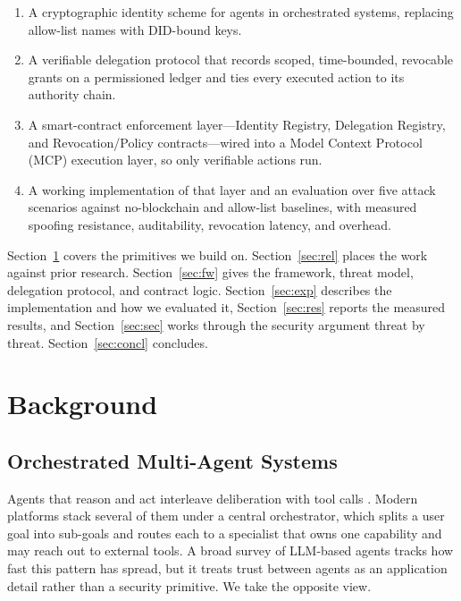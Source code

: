 \documentclass[conference]{IEEEtran}
\begin{document}
\begin{enumerate}
\item A cryptographic identity scheme for agents in orchestrated systems, replacing allow-list names with DID-bound keys.
\item A verifiable delegation protocol that records scoped, time-bounded, revocable grants on a permissioned ledger and ties every executed action to its authority chain.
\item A smart-contract enforcement layer---Identity Registry, Delegation Registry, and Revocation/Policy contracts---wired into a Model Context Protocol (MCP) execution layer, so only verifiable actions run.
\item A working implementation of that layer and an evaluation over five attack scenarios against no-blockchain and allow-list baselines, with measured spoofing resistance, auditability, revocation latency, and overhead.
\end{enumerate}

Section~\ref{sec:bg} covers the primitives we build on. Section~\ref{sec:rel} places the work against prior research. Section~\ref{sec:fw} gives the framework, threat model, delegation protocol, and contract logic. Section~\ref{sec:exp} describes the implementation and how we evaluated it, Section~\ref{sec:res} reports the measured results, and Section~\ref{sec:sec} works through the security argument threat by threat. Section~\ref{sec:concl} concludes.

\section{Background}\label{sec:bg}
\subsection{Orchestrated Multi-Agent Systems}
Agents that reason and act interleave deliberation with tool calls \cite{react2023}. Modern platforms stack several of them under a central orchestrator, which splits a user goal into sub-goals and routes each to a specialist that owns one capability and may reach out to external tools. A broad survey of LLM-based agents \cite{wang2024survey} tracks how fast this pattern has spread, but it treats trust between agents as an application detail rather than a security primitive. We take the opposite view.
\end{document}

